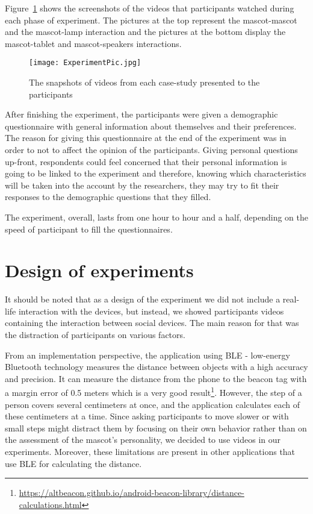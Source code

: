 Figure~\ref{fig:ExperimentPic} shows the screenshots of the videos that
participants watched during each phase of experiment.
The pictures at the top represent the mascot-mascot and the mascot-lamp interaction
and the pictures at the bottom display the mascot-tablet and mascot-speakers interactions.

\begin{figure}[hbt!]
  \centering
  \texttt{[image: ExperimentPic.jpg]}
  \caption[]{The snapshots of videos from each case-study presented to the participants\footnotemark}
  \label{fig:ExperimentPic}
\end{figure}

After finishing the experiment, the participants were given a demographic questionnaire
with general information about themselves and their preferences.
The reason for giving this questionnaire at the end of the experiment was in order
to not to affect the opinion of the participants.
Giving personal questions up-front, respondents could feel concerned that their personal
information is going to be linked to the experiment and therefore, knowing which
characteristics will be taken into the account by the researchers, they may try
to fit their responses to the demographic questions that they filled.

The experiment, overall, lasts from one hour to hour and a half, depending
on the speed of participant to fill the questionnaires.

\section{Design of experiments}
\label{sec:design-of-experiments}

It should be noted that as a design of the experiment we did not include a
real-life interaction with the devices, but instead, we showed participants videos
containing the interaction between social devices.
The main reason for that was the distraction of participants on various factors.

From an implementation perspective, the application using BLE - low-energy Bluetooth
technology measures the distance between objects with a high accuracy and precision.
It can measure the distance from the phone to the beacon tag with
a margin error of 0.5 meters which is a
very good result\footnote{\url{https://altbeacon.github.io/android-beacon-library/distance-calculations.html}}.
However, the step of a person covers several centimeters at once, and the
application calculates each of these centimeters at a time.
Since asking participants to move slower or with small steps might distract
them by focusing on their own behavior rather than on the assessment of the
mascot's personality, we decided to use videos in our experiments.
Moreover, these limitations are present in other applications that use BLE for calculating the distance.

